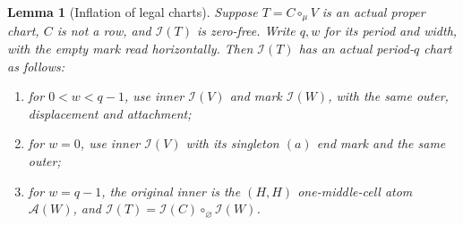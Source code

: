 \documentclass[11pt,a4paper]{amsart}
\numberwithin{equation}{section}
\theoremstyle{plain}
\newtheorem{lemma}[theorem]{Lemma}
\theoremstyle{definition}
\begin{document}
\begin{lemma}[Inflation of legal charts]\label{lem:inflate-chart}
Suppose \(T=C\circ_\mu V\) is an actual proper chart, \(C\) is not a row, and
\(\mathcal I(T)\) is zero-free.  Write \(q,w\) for its period and width, with the
empty mark read horizontally.  Then \(\mathcal I(T)\) has an actual period-\(q\)
chart as follows:
\begin{enumerate}
\item for \(0<w<q-1\), use inner \(\mathcal I(V)\) and mark \(\mathcal I(W)\),
 with the same outer, displacement and attachment;
\item for \(w=0\), use inner \(\mathcal I(V)\) with its singleton \((a)\) end mark
 and the same outer;
\item for \(w=q-1\), the original inner is the \((H,H)\) one-middle-cell atom
 \(\mathcal A(W)\), and
 \(\mathcal I(T)=\mathcal I(C)\circ_{\varnothing}\mathcal I(W)\).
\end{enumerate}
\end{lemma}
\end{document}
